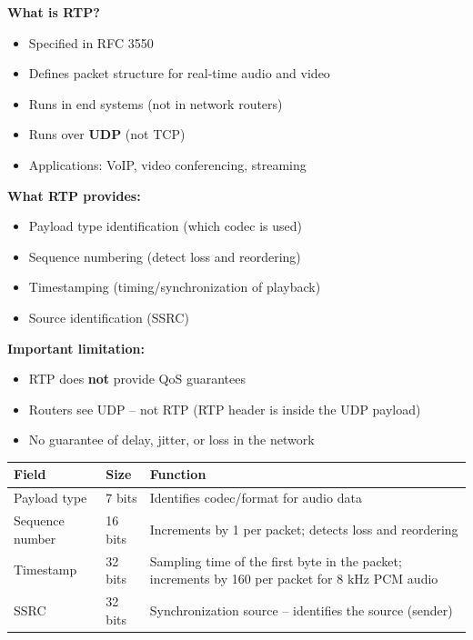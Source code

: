 \begin{tcolorbox}[keybox, title=RTP -- Overview]
\textbf{What is RTP?}
\begin{itemize}[nosep]
  \item Specified in RFC 3550
  \item Defines packet structure for real-time audio and video
  \item Runs in end systems (not in network routers)
  \item Runs over \textbf{UDP} (not TCP)
  \item Applications: VoIP, video conferencing, streaming
\end{itemize}

\medskip
\textbf{What RTP provides:}
\begin{itemize}[nosep]
  \item Payload type identification (which codec is used)
  \item Sequence numbering (detect loss and reordering)
  \item Timestamping (timing/synchronization of playback)
  \item Source identification (SSRC)
\end{itemize}

\medskip
\textbf{Important limitation:}
\begin{itemize}[nosep]
  \item RTP does \textbf{not} provide QoS guarantees
  \item Routers see UDP -- not RTP (RTP header is inside the UDP payload)
  \item No guarantee of delay, jitter, or loss in the network
\end{itemize}
\end{tcolorbox}

\begin{tcolorbox}[keybox, title=RTP Header fields]
\begin{center}
\begin{tabular}{p{3.5cm}p{2cm}p{7cm}}
\toprule
\textbf{Field} & \textbf{Size} & \textbf{Function} \\
\midrule
Payload type & 7 bits & Identifies codec/format for audio data \\
Sequence number & 16 bits & Increments by 1 per packet; detects loss and reordering \\
Timestamp & 32 bits & Sampling time of the first byte in the packet; increments by 160 per packet for 8 kHz PCM audio \\
SSRC & 32 bits & Synchronization source -- identifies the source (sender) \\
\bottomrule
\end{tabular}
\end{center}
\end{tcolorbox}

